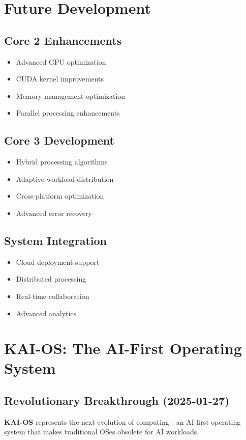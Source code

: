 \documentclass[12pt,a4paper]{article}
\begin{document}
\section{Future Development}

\subsection{Core 2 Enhancements}
\begin{itemize}
    \item Advanced GPU optimization
    \item CUDA kernel improvements
    \item Memory management optimization
    \item Parallel processing enhancements
\end{itemize}

\subsection{Core 3 Development}
\begin{itemize}
    \item Hybrid processing algorithms
    \item Adaptive workload distribution
    \item Cross-platform optimization
    \item Advanced error recovery
\end{itemize}

\subsection{System Integration}
\begin{itemize}
    \item Cloud deployment support
    \item Distributed processing
    \item Real-time collaboration
    \item Advanced analytics
\end{itemize}

\section{KAI-OS: The AI-First Operating System}

\subsection{Revolutionary Breakthrough (2025-01-27)}
\textbf{KAI-OS} represents the next evolution of computing - an AI-first operating system that makes traditional OSes obsolete for AI workloads.
\end{document}
